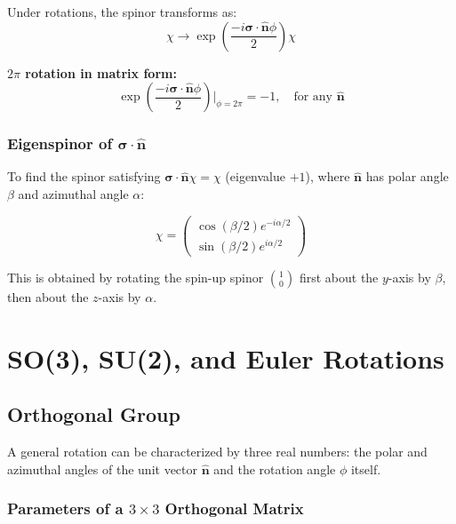 \documentclass[11pt,a4paper]{article}
\begin{document}
Under rotations, the spinor transforms as:
\begin{equation}
\chi \to \exp\left(\frac{-i\boldsymbol{\sigma}\cdot\hat{\mathbf{n}}\phi}{2}\right)\chi
\tag{3.64}
\end{equation}

\textbf{$2\pi$ rotation in matrix form:}
\begin{equation}
\exp\left(\frac{-i\boldsymbol{\sigma}\cdot\hat{\mathbf{n}}\phi}{2}\right)\bigg|_{\phi=2\pi} = -1, \quad \text{for any } \hat{\mathbf{n}}
\tag{3.67}
\end{equation}

\subsubsection{Eigenspinor of $\boldsymbol{\sigma}\cdot\hat{\mathbf{n}}$}

To find the spinor satisfying $\boldsymbol{\sigma}\cdot\hat{\mathbf{n}}\chi = \chi$ (eigenvalue $+1$), where $\hat{\mathbf{n}}$ has polar angle $\beta$ and azimuthal angle $\alpha$:

\begin{equation}
\boxed{\chi = \begin{pmatrix} \cos(\beta/2)e^{-i\alpha/2} \\ \sin(\beta/2)e^{i\alpha/2} \end{pmatrix}}
\tag{3.70}
\end{equation}

This is obtained by rotating the spin-up spinor $\binom{1}{0}$ first about the $y$-axis by $\beta$, then about the $z$-axis by $\alpha$.

\section{SO(3), SU(2), and Euler Rotations}

\subsection{Orthogonal Group}

A general rotation can be characterized by three real numbers: the polar and azimuthal angles of the unit vector $\hat{\mathbf{n}}$ and the rotation angle $\phi$ itself.

\subsubsection{Parameters of a $3 \times 3$ Orthogonal Matrix}
\end{document}
